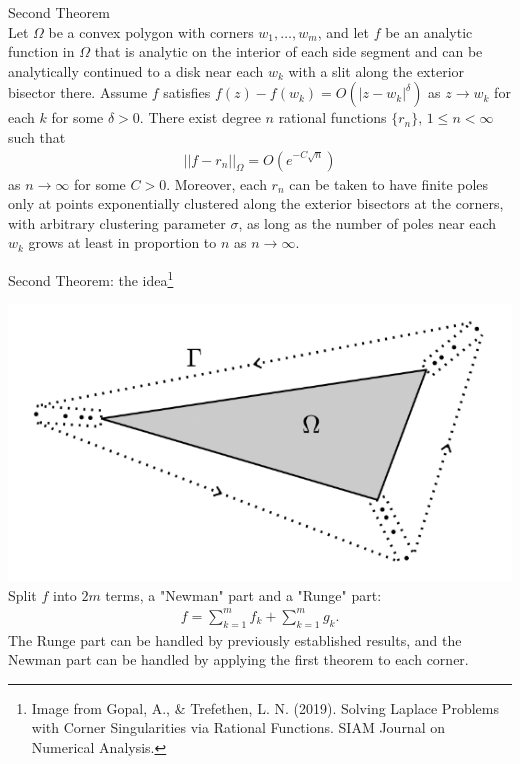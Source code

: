\documentclass{seminar}
\begin{document}
\begin{slide} %
\large Second Theorem \\

\small
Let $\Omega$ be a convex polygon with corners $w_1 , \ldots , w_m$, and let $f$ be an analytic function in $\Omega$ that is analytic on the interior of each side segment and can be analytically continued to a disk near each $w_k$ with a slit along the exterior bisector there. Assume $f$ satisfies $f(z)-f(w_k)=O(|z-w_k|^\delta)$ as $z \to w_k$ for each $k$ for some $\delta >0$. There exist degree $n$ rational functions $\{r_n\},\, 1 \leq n < \infty$ such that
	\begin{align*}
	||f-r_n||_\Omega=O(e^{-C\sqrt{n}})
	\end{align*}
as $n\to \infty$ for some $C>0$. Moreover, each $r_n$ can be taken to have finite poles only at points exponentially clustered along the exterior bisectors at the corners, with arbitrary clustering parameter $\sigma$, as long as the number of poles near each $w_k$ grows at least in proportion to $n$ as $n\to \infty$.
\end{slide} %




\begin{slide} %
\large Second Theorem: the idea\footnote{Image from Gopal, A., \& Trefethen, L. N. (2019). Solving Laplace Problems with Corner Singularities via Rational Functions. SIAM Journal on Numerical Analysis.}

\small
\includegraphics[scale=0.4]{./PNG/polygon_illust}\\
Split $f$ into $2m$ terms, a "Newman" part and a "Runge" part:
\begin{align*}
f=\sum_{k=1}^m f_k + \sum_{k=1}^m g_k.
\end{align*}
The Runge part can be handled by previously established results, and the Newman part can be handled by applying the first theorem to each corner.
\end{slide} %
\end{document}
